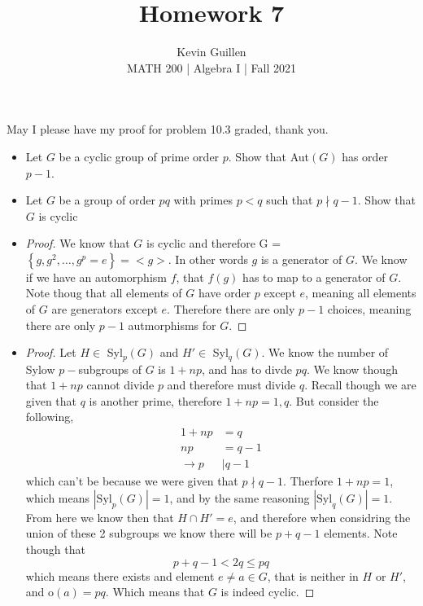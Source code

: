 \documentclass[11pt]{article}
\newenvironment{problem}[2][Problem\!]{\begin{trivlist}
\item[\hskip \labelsep {\bfseries #1}\hskip \labelsep {\bfseries #2}]}{\end{trivlist}}
\newcommand{\set}[1]{\left\{#1\right\}} %
\renewcommand{\leq}{\leqslant}
\begin{document}
 
\title{Homework 7}
\author{Kevin Guillen\\[0.5em]
MATH 200 | Algebra I | Fall 2021}
\date{} 
\maketitle


May I please have my proof for problem 10.3 graded, thank you.

\begin{tcolorbox}
    \begin{problem} {7.2}
        \begin{itemize}
            \item[(a)] Let $G$ be a cyclic group of prime order $p$. Show that Aut$(G)$ has order $p-1$.
            \item[(b)] Let $G$ be a group of order $pq$ with primes $p < q$ such that $p \nmid q-1$. Show that $G$ is cyclic
        \end{itemize}
    \end{problem}
\end{tcolorbox}
\begin{itemize}
    \item[(a)]
    \begin{proof}
        We know that $G$ is cyclic and therefore G = $\set{g, g^{2}, \dots, g^{p} = e} = <g>$. In other words $g$ is a generator of $G$. We know if we have an automorphism $f$, that $f(g)$ has to map to a generator of $G$. Note thoug that all elements of $G$ have order $p$ except $e$, meaning all elements of $G$ are generators except $e$. Therefore there are only $p-1$ choices, meaning there are only $p-1$ autmorphisms for $G$.
    \end{proof} 
    \item[(b)]
    \begin{proof}
        Let $H \in $ Syl$_p(G)$ and $H' \in $ Syl$_q(G)$. We know the number of Sylow $p-$subgroups of $G$ is $1+np$, and has to divde $pq$. We know though that $1 +np$ cannot divide $p$ and therefore must divide $q$. Recall though we are given that $q$ is another prime, therefore $1 +np = 1, q$. But consider the following,
        \begin{align*}
            1 +np &= q \\
            np &= q-1 \\
            \rightarrow p &\mid q-1  
        \end{align*}
        which can't be because we were given that $p \nmid q-1$. Therfore $1 +np =1$, which means $|\text{Syl}_p(G)| = 1$, and by the same reasoning $|\text{Syl}_q(G)| = 1$. From here we know then that $H \cap H' = e$, and therefore when considring the union of these 2 subgroups we know there will be $p +q -1$ elements. Note though that \[p +q -1 < 2q \leq pq\]
        which means there exists and element $e \neq a \in G$, that is neither in $H$ or $H'$, and o$(a) = pq$. Which means that $G$ is indeed cyclic.
    \end{proof} 
\end{itemize}
\end{document}
